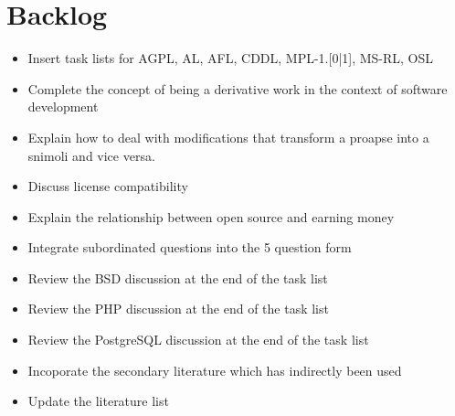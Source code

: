 %
%
%
%


\chapter*{Backlog} 

\begin{footnotesize}
\begin{itemize}
  \item Insert task lists for AGPL, AL, AFL, CDDL, MPL-1.[0|1], MS-RL, OSL
  \item Complete the concept of being a derivative work in the context of
  software development
  \item Explain how to deal with modifications that transform a proapse into a
  snimoli and vice versa.
  \item Discuss license compatibility
  \item Explain the relationship between open source and earning money
  \item Integrate subordinated questions into the 5 question form
  \item Review the BSD discussion at the end of the task list 
  \item Review the PHP discussion at the end of the task list
  \item Review the PostgreSQL discussion at the end of the task list

  \item Incoporate the secondary literature which has indirectly been used
  \item Update the literature list
\end{itemize}
\end{footnotesize}

%


